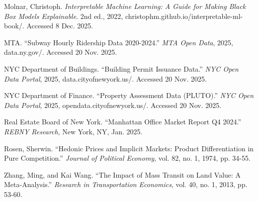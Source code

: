\documentclass[12pt,letterpaper]{article}
\begin{document}
\begin{singlespace}
\hangindent=0.5in Molnar, Christoph. \textit{Interpretable Machine Learning: A Guide for Making Black Box Models Explainable}. 2nd ed., 2022, christophm.github.io/interpretable-ml-book/. Accessed 8 Dec. 2025.

\hangindent=0.5in MTA. ``Subway Hourly Ridership Data 2020-2024.'' \textit{MTA Open Data}, 2025, data.ny.gov/. Accessed 20 Nov. 2025.

\hangindent=0.5in NYC Department of Buildings. ``Building Permit Issuance Data.'' \textit{NYC Open Data Portal}, 2025, data.cityofnewyork.us/. Accessed 20 Nov. 2025.

\hangindent=0.5in NYC Department of Finance. ``Property Assessment Data (PLUTO).'' \textit{NYC Open Data Portal}, 2025, opendata.cityofnewyork.us/. Accessed 20 Nov. 2025.

\hangindent=0.5in Real Estate Board of New York. ``Manhattan Office Market Report Q4 2024.'' \textit{REBNY Research}, New York, NY, Jan. 2025.

\hangindent=0.5in Rosen, Sherwin. ``Hedonic Prices and Implicit Markets: Product Differentiation in Pure Competition.'' \textit{Journal of Political Economy}, vol. 82, no. 1, 1974, pp. 34-55.

\hangindent=0.5in Zhang, Ming, and Kai Wang. ``The Impact of Mass Transit on Land Value: A Meta-Analysis.'' \textit{Research in Transportation Economics}, vol. 40, no. 1, 2013, pp. 53-60.

\end{singlespace}
\end{document}
